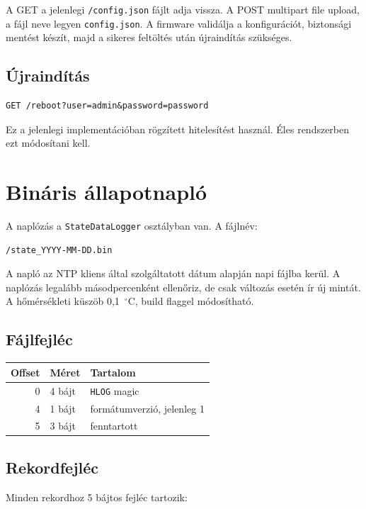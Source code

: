 \documentclass[11pt,a4paper]{article}
\begin{document}
A GET a jelenlegi \texttt{/config.json} fájlt adja vissza. A POST multipart file upload, a fájl neve legyen \texttt{config.json}. A firmware validálja a konfigurációt, biztonsági mentést készít, majd a sikeres feltöltés után újraindítás szükséges.

\subsection{Újraindítás}

\begin{lstlisting}
GET /reboot?user=admin&password=password
\end{lstlisting}

Ez a jelenlegi implementációban rögzített hitelesítést használ. Éles rendszerben ezt módosítani kell.

\section{Bináris állapotnapló}

A naplózás a \texttt{StateDataLogger} osztályban van. A fájlnév:

\begin{lstlisting}
/state_YYYY-MM-DD.bin
\end{lstlisting}

A napló az NTP kliens által szolgáltatott dátum alapján napi fájlba kerül. A naplózás legalább másodpercenként ellenőriz, de csak változás esetén ír új mintát. A hőmérsékleti küszöb 0,1~$^\circ$C, build flaggel módosítható.

\subsection{Fájlfejléc}

\begin{longtable}{rll}
\toprule
Offset & Méret & Tartalom \\
\midrule
0 & 4 bájt & \texttt{HLOG} magic \\
4 & 1 bájt & formátumverzió, jelenleg 1 \\
5 & 3 bájt & fenntartott \\
\bottomrule
\end{longtable}

\subsection{Rekordfejléc}

Minden rekordhoz 5 bájtos fejléc tartozik:
\end{document}
